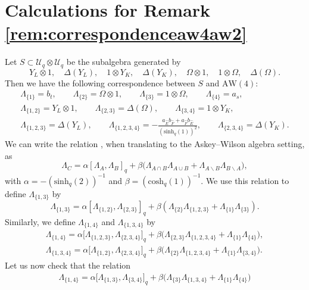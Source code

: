 \documentclass[10pt,a4paper]{amsart}
\numberwithin{equation}{section}
\newcommand{\chq}{\mathrm{cosh}_q}
\newcommand{\shq}{\mathrm{sinh}_q}
\newcommand{\Uq}{\mathcal{U}_q}
\begin{document}
\section{Calculations for Remark \ref{rem:correspondenceaw4aw2}}\label{app:calculationsrelationsAW4}
Let $S\subset \Uq\otimes\Uq$ be the subalgebra generated by
\[Y_L\otimes 1,\quad \Delta(Y_L),\quad 1\otimes Y_K,\quad \Delta(Y_K),\quad \Omega\otimes 1,\quad 1\otimes \Omega,\quad \Delta(\Omega).\]
Then we have the following correspondence between $S$ and $\mathrm{AW}(4)$:
\begin{gather}
		\Lambda_{\{1\}} =b_t, \qquad \Lambda_{\{2\}}=\Omega\otimes 1, \qquad \Lambda_{\{3\}}=1 \otimes \Omega, \qquad \Lambda_{\{4\}}=a_s, \nonumber\\
		\Lambda_{\{1,2\}} =Y_L\otimes 1,\qquad \Lambda_{\{2,3\}}=\Delta(\Omega), \qquad \Lambda_{\{3,4\}}=1\otimes Y_K, \nonumber\\
		\Lambda_{\{1,2,3\}} =\Delta(Y_L), \qquad \Lambda_{\{1,2,3,4\}}=-\frac{a_{\hat{E}}b_{\hat{F}}+a_{\hat{F}}b_{\hat{E}}}{(\shq(1))^2}, \qquad \Lambda_{\{2,3,4\}} =\Delta(Y_K).\label{eq:StoAW4}
	\end{gather}
We can write the relation \cite[equation~(23)]{DeBie2020}, when translating to the Askey--Wilson algebra setting, as
\[
\Lambda_{C}=\alpha[\Lambda_{A},\Lambda_{B}]_q + \beta\big(\Lambda_{A\cap B}\Lambda_{A\cup B}+\Lambda_{A\backslash B}\Lambda_{B\backslash A}\big),
\]
with $\alpha= -(\shq(2))^{-1}$ and $\beta=(\chq(1))^{-1}$. We use this relation to define $\Lambda_{\{1,3\}}$ by
\[
\Lambda_{\{1,3\}}=\alpha[\Lambda_{\{1,2\}},\Lambda_{\{2,3\}}]_q + \beta \left( \Lambda_{\{2\}}\Lambda_{\{1,2,3\}}+\Lambda_{\{1\}}\Lambda_{\{3\}} \right).
\]
Similarly, we define $\Lambda_{\{1,4\}}$ and $\Lambda_{\{1,3,4\}}$ by
\begin{gather*}
	\Lambda_{\{1,4\}}=\alpha \big[\Lambda_{\{1,2,3\}},\Lambda_{\{2,3,4\}} \big]_q + \beta \big( \Lambda_{\{2,3\}}\Lambda_{\{1,2,3,4\}}+\Lambda_{\{1\}}\Lambda_{\{4\}} \big),\\
	\Lambda_{\{1,3,4\}}=\alpha \big[\Lambda_{\{1,2\}},\Lambda_{\{2,3,4\}} \big]_q + \beta \big( \Lambda_{\{2\}}\Lambda_{\{1,2,3,4\}}+\Lambda_{\{1\}}\Lambda_{\{3,4\}} \big).
\end{gather*}
Let us now check that the relation
\begin{gather}
	\Lambda_{\{1,4\}}=\alpha \big[\Lambda_{\{1,3\}},\Lambda_{\{3,4\}} \big]_q + \beta \big( \Lambda_{\{3\}}\Lambda_{\{1,3,4\}}+\Lambda_{\{1\}}\Lambda_{\{4\}} \big)\label{eq:relationtocheck}
\end{gather}
\end{document}
